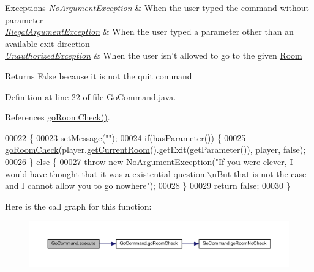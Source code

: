 \begin{DoxyExceptions}{Exceptions}
{\em \hyperlink{classNoArgumentException}{No\-Argument\-Exception}} & When the user typed the command without parameter \\
\hline
{\em \hyperlink{classIllegalArgumentException}{Illegal\-Argument\-Exception}} & When the user typed a parameter other than an available exit direction \\
\hline
{\em \hyperlink{classUnauthorizedException}{Unauthorized\-Exception}} & When the user isn't allowed to go to the given \hyperlink{classRoom}{Room} \\
\hline
\end{DoxyExceptions}
\begin{DoxyReturn}{Returns}
False because it is not the quit command 
\end{DoxyReturn}


Definition at line \hyperlink{GoCommand_8java_source_l00022}{22} of file \hyperlink{GoCommand_8java_source}{Go\-Command.\-java}.



References \hyperlink{GoCommand_8java_source_l00040}{go\-Room\-Check()}.


\begin{DoxyCode}
00022                                                                                                            
               \{
00023         setMessage(\textcolor{stringliteral}{""});
00024         \textcolor{keywordflow}{if}(hasParameter()) \{
00025             \hyperlink{classGoCommand_a1fce2ad8ed1faf41fa300064585b3616}{goRoomCheck}(player.\hyperlink{classPlayer_a3a3107df50fc4e35e8c0f46c3f776ce6}{getCurrentRoom}().getExit(getParameter()), player, \textcolor{keyword}{
      false});
00026         \} \textcolor{keywordflow}{else} \{
00027             \textcolor{keywordflow}{throw} \textcolor{keyword}{new} \hyperlink{classNoArgumentException}{NoArgumentException}(\textcolor{stringliteral}{"If you were clever, I would have thought that
       it was a existential question.\(\backslash\)nBut that is not the case and I cannot allow you to go nowhere"});
00028         \}
00029         \textcolor{keywordflow}{return} \textcolor{keyword}{false};
00030     \}
\end{DoxyCode}


Here is the call graph for this function\-:
\nopagebreak
\begin{figure}[H]
\begin{center}
\leavevmode
\includegraphics[width=350pt]{classGoCommand_a77a61c2a3b89dca45b51e06f3bcb3ba7_cgraph}
\end{center}
\end{figure}


